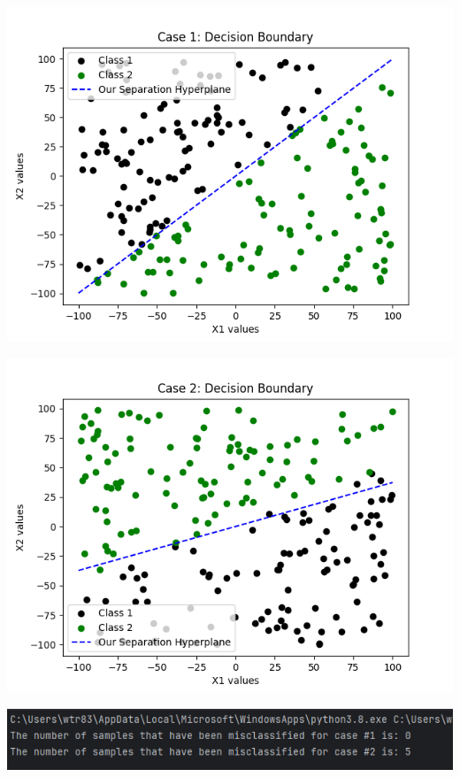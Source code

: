 \documentclass{article}
\begin{document}
\begin{center}
\includegraphics[scale=0.75]{../figs/P1.2.png}\\
\end{center}

\begin{center}
\includegraphics[scale=0.75]{../figs/P1.3.png}\\
\end{center}

\begin{center}
\includegraphics[scale=0.75]{../figs/P1.4.png}\\
\end{center}
\end{document}
